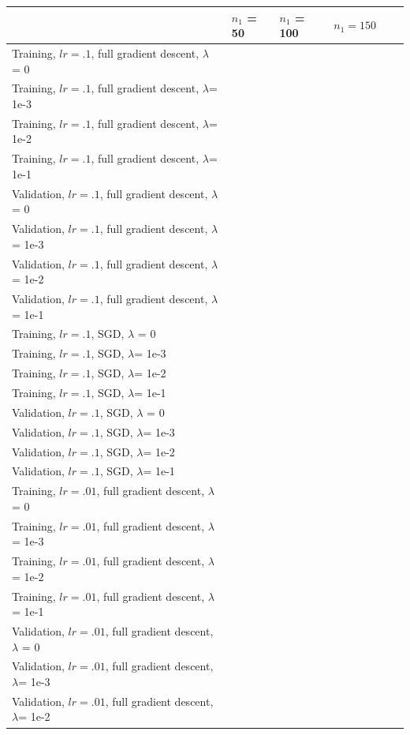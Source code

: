 \documentclass[10pt]{article}
\begin{document}
\begin{table}
\centering
\begin{tabular}{llllll}
\toprule
& $n_1$ = 50 & $n_1$ = 100 & $n_1 = 150$ \\
\midrule
Training, $lr = .1$, full gradient descent, $\lambda$ = 0 & && \\
Training, $lr = .1$, full gradient descent, $\lambda$= 1e-3 & && \\
Training, $lr = .1$, full gradient descent, $\lambda$= 1e-2 & && \\
Training, $lr = .1$, full gradient descent, $\lambda$= 1e-1 & && \\
Validation, $lr = .1$, full gradient descent, $\lambda$ = 0 & && \\
Validation, $lr = .1$, full gradient descent, $\lambda$= 1e-3 & && \\
Validation, $lr = .1$, full gradient descent, $\lambda$= 1e-2 & && \\
Validation, $lr = .1$, full gradient descent, $\lambda$= 1e-1 & && \\
Training, $lr = .1$, SGD, $\lambda$ = 0 & && \\
Training, $lr = .1$, SGD, $\lambda$= 1e-3 & && \\
Training, $lr = .1$, SGD, $\lambda$= 1e-2 & && \\
Training, $lr = .1$, SGD, $\lambda$= 1e-1 & && \\
Validation, $lr = .1$, SGD, $\lambda$ = 0 & && \\
Validation, $lr = .1$, SGD, $\lambda$= 1e-3 & && \\
Validation, $lr = .1$, SGD, $\lambda$= 1e-2 & && \\
Validation, $lr = .1$, SGD, $\lambda$= 1e-1 & && \\
Training, $lr = .01$, full gradient descent, $\lambda$ = 0 & && \\
Training, $lr = .01$, full gradient descent, $\lambda$= 1e-3 & && \\
Training, $lr = .01$, full gradient descent, $\lambda$= 1e-2 & && \\
Training, $lr = .01$, full gradient descent, $\lambda$= 1e-1 & && \\
Validation, $lr = .01$, full gradient descent, $\lambda$ = 0 & && \\
Validation, $lr = .01$, full gradient descent, $\lambda$= 1e-3 & && \\
Validation, $lr = .01$, full gradient descent, $\lambda$= 1e-2 & && \\

\end{tabular}
\end{table}
\end{document}
